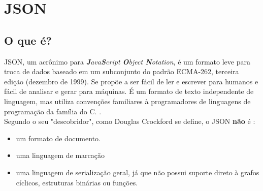 \section{JSON}
\subsection{O que é?}
JSON, um acrônimo para \textit{\textbf{J}ava\textbf{S}cript \textbf{O}bject \textbf{N}otation}, é um formato leve para troca de dados baseado em um subconjunto do padrão ECMA-262, terceira edição (dezembro de 1999). Se propõe a ser fácil de ler e escrever para humanos e fácil de analisar e gerar para máquinas. É um formato de texto independente de linguagem, mas utiliza convenções familiares à programadores de linguagens de programação da família do C. \cite{jsonorg}.\\
Segundo o seu "descobridor", como Douglas Crockford se define, o JSON \textbf{não} é  \cite{jsonsaga}: 
\begin{itemize}
  \item um formato de documento.
  \item uma linguagem de marcação
  \item uma linguagem de serialização geral, já que não possui suporte direto à grafos cíclicos, estruturas binárias ou funções.
\end{itemize}

